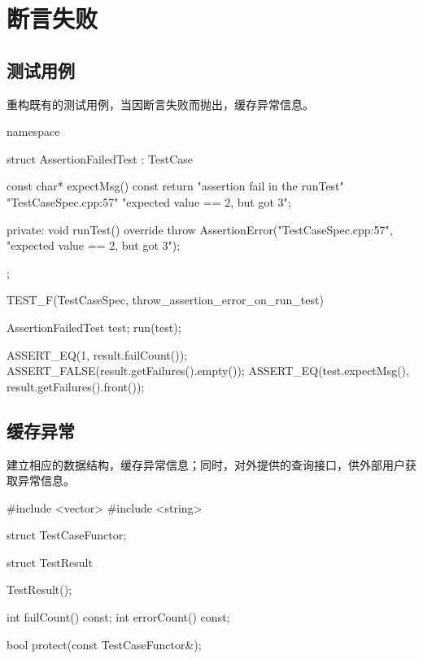 \section{断言失败}

\begin{content}

\subsection{测试用例}

重构既有的测试用例，当因断言失败而抛出，缓存异常信息。

\begin{leftbar}
 \begin{c++}[caption={\ttfamily{test/mars/core/TestCaseSpec.cc}}]
namespace {
  struct AssertionFailedTest : TestCase {
    const char* expectMsg() const {
      return "assertion fail in the runTest\n"
              "TestCaseSpec.cpp:57\n"
              "expected value == 2, but got 3";
    }

  private:
    void runTest() override {
      throw AssertionError("TestCaseSpec.cpp:57", "expected value == 2, but got 3");
    }
  };
}

TEST_F(TestCaseSpec, throw_assertion_error_on_run_test) {
  AssertionFailedTest test;
  run(test);

  ASSERT_EQ(1, result.failCount());
  ASSERT_FALSE(result.getFailures().empty());
  ASSERT_EQ(test.expectMsg(), result.getFailures().front());
}
 \end{c++}
\end{leftbar}

\subsection{缓存异常}

建立相应的数据结构，缓存异常信息；同时，对外提供的查询接口，供外部用户获取异常信息。

\begin{leftbar}
 \begin{c++}[caption={\ttfamily{include/mars/core/TestResult.h}}]
#include <vector>
#include <string>

struct TestCaseFunctor;

struct TestResult {
  TestResult();

  int failCount() const;
  int errorCount() const;

  bool protect(const TestCaseFunctor&);

}
\end{c++}
\end{leftbar}
\end{content}
